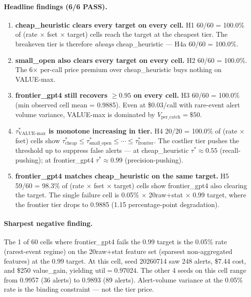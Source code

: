 \paragraph{Headline findings (6/6 PASS).}
\begin{enumerate}
\item \textbf{cheap\_heuristic clears every target on every cell.}
H1 60/60 = 100.0\% of (rate $\times$ fset $\times$ target) cells reach
the target at the cheapest tier. The breakeven tier is therefore
\emph{always} cheap\_heuristic — H4a 60/60 = 100.0\%.
\item \textbf{small\_open also clears every target on every cell.}
H2 60/60 = 100.0\%. The 6$\times$ per-call price premium over
cheap\_heuristic buys nothing on VALUE-max.
\item \textbf{frontier\_gpt4 still recovers $\geq 0.95$ on every cell.}
H3 60/60 = 100.0\% (min observed cell mean = 0.9885). Even at \$0.03/call
with rare-event alert volume variance, VALUE-max is dominated by
$V_{\text{per\_catch}} = \$50$.
\item \textbf{$\tau^*_{\text{VALUE-max}}$ is monotone increasing in tier.}
H4 20/20 = 100.0\% of (rate $\times$ fset) cells show
$\tau^*_{\text{cheap}} \leq \tau^*_{\text{small\_open}} \leq \cdots \leq
\tau^*_{\text{frontier}}$. The costlier tier pushes the threshold up
to suppress false alerts — at cheap\_heuristic $\tau^* \approx 0.55$
(recall-pushing); at frontier\_gpt4 $\tau^* \approx 0.99$
(precision-pushing).
\item \textbf{frontier\_gpt4 matches cheap\_heuristic on the same target.}
H5 59/60 = 98.3\% of (rate $\times$ fset $\times$ target) cells show
frontier\_gpt4 also clearing the target. The single failure cell is
0.05\% $\times$ 20raw+stat $\times$ 0.99 target, where the
frontier tier drops to 0.9885 (1.15 percentage-point degradation).
\end{enumerate}

\paragraph{Sharpest negative finding.}
The 1 of 60 cells where frontier\_gpt4 fails the 0.99 target is the
0.05\% rate (rarest-event regime) on the 20raw+stat feature set
(sparsest non-aggregated features) at the 0.99 target. At this cell,
seed 20260714 saw 248 alerts, \$7.44 cost, and \$250 value\_gain, yielding
$\mathrm{util} = 0.97024$. The other 4 seeds on this cell range from
0.9957 (36 alerts) to 0.9893 (89 alerts). Alert-volume variance
at the 0.05\% rate is the binding constraint — not the tier price.

